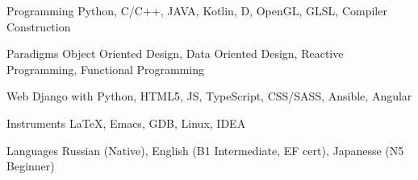


\begin{cvskills}


\cvskill
{Programming} %
{Python, C/C++, JAVA, Kotlin, D, OpenGL, GLSL, Compiler Construction} %

\cvskill
{Paradigms} %
{Object Oriented Design, Data Oriented Design, Reactive Programming, Functional Programming}



\cvskill
{Web} %
{Django with Python, HTML5, JS, TypeScript, CSS/SASS, Ansible, Angular} %

\cvskill
{Instruments}
{LaTeX, Emacs, GDB, Linux, IDEA}


\cvskill
{Languages} %
{Russian (Native), English (B1 Intermediate, EF cert), Japanesse (N5 Beginner)} %


\end{cvskills}
